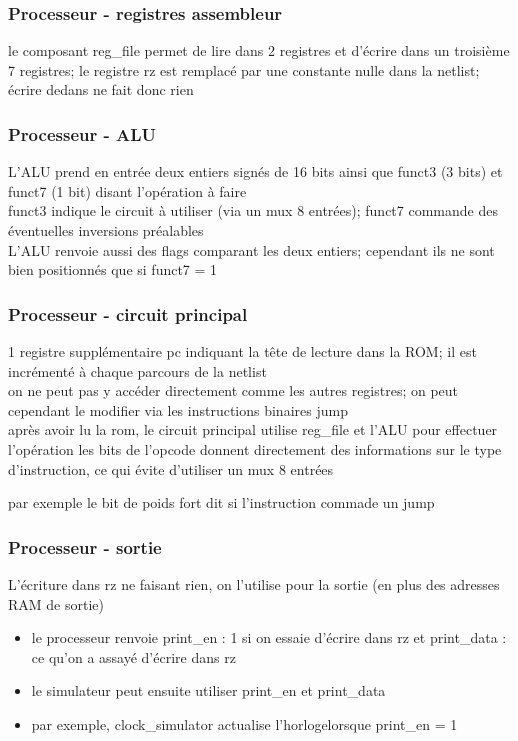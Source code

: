 \documentclass[xcolor=pst,10pt,onlymath]{beamer}
\begin{document}
\begin{frame}
    \frametitle{Processeur - registres assembleur}
    le composant reg_file permet de lire dans 2 registres et d'écrire dans un troisième \\
    7 registres; le registre rz est remplacé par une constante nulle dans la netlist; 
        écrire dedans ne fait donc rien
\end{frame}

\begin{frame}
    \frametitle{Processeur - ALU}
    L'ALU prend en entrée deux entiers signés de 16 bits ainsi que funct3 (3 bits) et funct7 (1 bit) disant l'opération à faire \\
    funct3 indique le circuit à utiliser (via un mux 8 entrées); funct7 commande des éventuelles inversions préalables \\
    L'ALU renvoie aussi des flags comparant les deux entiers; cependant ils ne sont bien positionnés que si funct7 = 1
\end{frame}

\begin{frame}
    \frametitle{Processeur - circuit principal}
    1 registre supplémentaire pc indiquant la tête de lecture dans la ROM; il est incrémenté à chaque parcours de la netlist \\
    on ne peut pas y accéder directement comme les autres registres; on peut cependant le modifier via les instructions binaires jump \\
    après avoir lu la rom, le circuit principal utilise reg_file et l'ALU pour effectuer l'opération
    les bits de l'opcode donnent directement des informations sur le type d'instruction, ce qui évite d'utiliser un mux 8 entrées
    \begin{itemize}
        par exemple le bit de poids fort dit si l'instruction commade un jump
    \end{itemize}
\end{frame}

\begin{frame}
    \frametitle{Processeur - sortie}
    L'écriture dans rz ne faisant rien, on l'utilise pour la sortie (en plus des adresses RAM de sortie)
    \begin{itemize}
        \item le processeur renvoie print_en : 1 si on essaie d'écrire dans rz et print_data : ce qu'on a assayé d'écrire dans rz
        \item le simulateur peut ensuite utiliser print_en et print_data
        \item par exemple, clock_simulator actualise l'horlogelorsque print_en = 1
    \end{itemize}
\end{frame}
\end{document}
